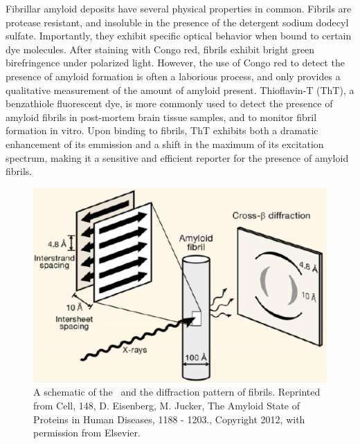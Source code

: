 Fibrillar amyloid deposits have several physical properties in common. Fibrils are protease resistant, and insoluble in the presence of the detergent sodium dodecyl sulfate.\cite{Eisenberg:2012hm} Importantly, they exhibit specific optical behavior when bound to certain dye molecules. After staining with Congo red, fibrils exhibit bright green birefringence under polarized light.\cite{Frid:2007bo} However, the use of Congo red to detect the presence of amyloid formation is often a laborious process, and only provides a qualitative measurement of the amount of amyloid present.\cite{Frid:2007bo} Thioflavin-T (ThT), a benzathiole fluorescent dye, is more commonly used to detect the presence of amyloid fibrils in post-mortem brain tissue samples, and to monitor fibril formation in vitro. Upon binding to fibrils, ThT exhibits both a dramatic enhancement of its emmission and a shift in the maximum of its excitation spectrum, making it a sensitive and efficient reporter for the presence of amyloid fibrils.\cite{Nilsson:2004iw}

\begin{figure}
 \centering
 \includegraphics[width=5in]{figures/introduction/fibril_structure_diffraction.pdf}
 \caption[Characteristic cross-$\beta$ spacings from X-ray fibre diffraction studies of amyloid fibrils]{A schematic of the \crossbs\ and the diffraction pattern of fibrils. Reprinted from Cell, 148, D. Eisenberg, M. Jucker, The Amyloid State of Proteins in Human Diseases, 1188 - 1203.,  Copyright 2012, with permission from Elsevier.}
 \label{fig:fibril_diffraction}
\end{figure}


